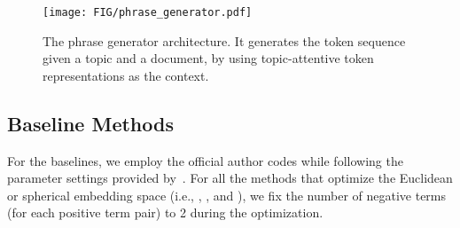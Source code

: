 \begin{figure}[t]
    \centering
    \texttt{[image: FIG/phrase\_generator.pdf]}
    \caption{The phrase generator architecture. It generates the token sequence given a topic and a document, by using topic-attentive token representations as the context.
    }
    \label{fig:phrase_generator}
\end{figure}

\subsection{Baseline Methods}
\label{subsec:basedetail}
For the baselines, we employ the official author codes while following the parameter settings provided by~\cite{lee2022taxocom}.
For all the methods that optimize the Euclidean or spherical embedding space (i.e., \taxogen, \corel, and \taxocom), we fix the number of negative terms (for each positive term pair) to 2 during the optimization.

